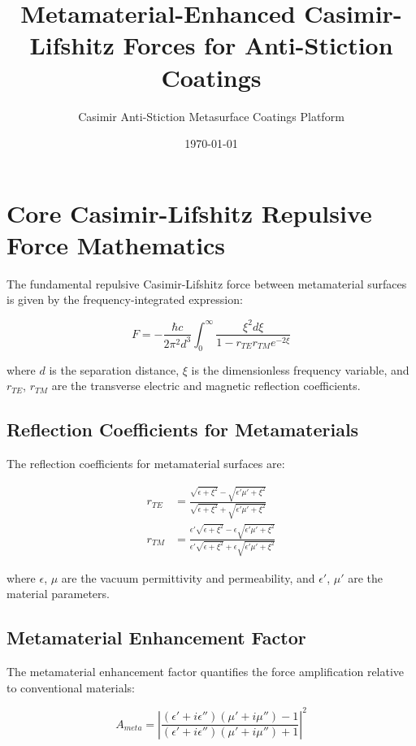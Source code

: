 \documentclass{article}
\title{Metamaterial-Enhanced Casimir-Lifshitz Forces for Anti-Stiction Coatings}
\author{Casimir Anti-Stiction Metasurface Coatings Platform}
\date{\today}
\begin{document}
\maketitle

\section{Core Casimir-Lifshitz Repulsive Force Mathematics}

The fundamental repulsive Casimir-Lifshitz force between metamaterial surfaces is given by the frequency-integrated expression:

\begin{equation}\label{eq:casimir_force}
F = -\frac{\hbar c}{2\pi^2 d^3} \int_0^\infty \frac{\xi^2 d\xi}{1 - r_{TE}r_{TM}e^{-2\xi}}
\end{equation}

where $d$ is the separation distance, $\xi$ is the dimensionless frequency variable, and $r_{TE}$, $r_{TM}$ are the transverse electric and magnetic reflection coefficients.

\subsection{Reflection Coefficients for Metamaterials}

The reflection coefficients for metamaterial surfaces are:

\begin{align}
r_{TE} &= \frac{\sqrt{\epsilon + \xi^2} - \sqrt{\epsilon'\mu' + \xi^2}}{\sqrt{\epsilon + \xi^2} + \sqrt{\epsilon'\mu' + \xi^2}}\label{eq:r_te}\\
r_{TM} &= \frac{\epsilon'\sqrt{\epsilon + \xi^2} - \epsilon\sqrt{\epsilon'\mu' + \xi^2}}{\epsilon'\sqrt{\epsilon + \xi^2} + \epsilon\sqrt{\epsilon'\mu' + \xi^2}}\label{eq:r_tm}
\end{align}

where $\epsilon$, $\mu$ are the vacuum permittivity and permeability, and $\epsilon'$, $\mu'$ are the material parameters.

\subsection{Metamaterial Enhancement Factor}

The metamaterial enhancement factor quantifies the force amplification relative to conventional materials:

\begin{equation}\label{eq:enhancement_factor}
A_{meta} = \left|\frac{(\epsilon'+i\epsilon'')(\mu'+i\mu'')-1}{(\epsilon'+i\epsilon'')(\mu'+i\mu'')+1}\right|^2
\end{equation}
\end{document}
